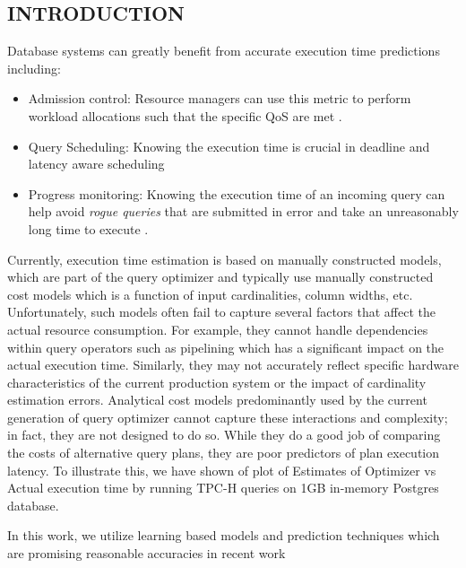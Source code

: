 \documentclass{article}
\begin{document}
	\begin{multicols}{2}
	\section{INTRODUCTION}
	Database systems can greatly benefit from accurate execution time predictions including: 
	\begin{itemize}
	\item Admission control: Resource managers can use this metric to perform workload allocations such that the specific QoS are met \cite{activeSLA}.
	\item Query Scheduling: Knowing the execution time is crucial in deadline and latency aware 			scheduling
	\item Progress monitoring: Knowing the execution time of an incoming query can help avoid \textit{rogue queries} that are submitted in error and take an unreasonably long time to execute \cite{progress}.
	\end{itemize}
	Currently, execution time estimation is based on manually constructed
	models, which are part of the query optimizer and typically use
	manually constructed cost models which is a function of input cardinalities, 
	column widths, etc. Unfortunately, such
	models often fail to capture several factors that affect the actual
	resource consumption. For example, they cannot handle dependencies within query operators 
	such as pipelining which has a significant impact on the actual execution time.
	Similarly, they may not accurately reflect
	specific hardware characteristics of the current production system
	or the impact of cardinality estimation errors. Analytical cost models predominantly 
	used by the current generation of query optimizer cannot
	capture these interactions and complexity; in fact, they are not designed to do so. 
	While they do a good job of comparing the costs of alternative query plans,
	they are poor predictors of plan execution latency. To illustrate this, we have shown of plot of 		
	Estimates of Optimizer vs Actual execution time by running TPC-H queries on 1GB in-memory Postgres 		
	database.
	
	In this work, we utilize learning based models and prediction techniques which are promising reasonable accuracies in recent work \cite{ICDE2012,MSR,ganapathi}
	

\end{multicols}
\end{document}
